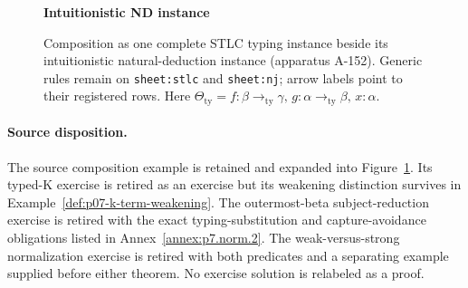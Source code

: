 \begin{landscape}
\begin{figure}[p]
\begin{minipage}[t]{.49\linewidth}
\centering\scriptsize
\textbf{Intuitionistic ND instance}\\[4pt]
\end{minipage}
\caption{Composition as one complete STLC typing instance beside its
intuitionistic natural-deduction instance (apparatus A-152).  Generic rules
remain on \texttt{sheet:stlc} and \texttt{sheet:nj}; arrow labels point to
their registered rows.  Here
\(\Theta_{\mathrm{ty}}=
f{:}\beta\mathbin{\to_{\mathrm{ty}}}\gamma,\,
g{:}\alpha\mathbin{\to_{\mathrm{ty}}}\beta,\,x{:}\alpha\).}
\label{fig:p07-stlc-nd-derivation}
\end{figure}
\end{landscape}
\clearpage

\paragraph{Source disposition.}
The source composition example is retained and expanded into
Figure~\ref{fig:p07-stlc-nd-derivation}.  Its typed-K exercise is retired as
an exercise but its weakening distinction survives in
Example~\ref{def:p07-k-term-weakening}.  The outermost-beta subject-reduction
exercise is retired with the exact typing-substitution and capture-avoidance
obligations listed in Annex~\ref{annex:p7.norm.2}.  The weak-versus-strong
normalization exercise is retired with both predicates and a separating
example supplied before either theorem.  No exercise solution is relabeled
as a proof.
